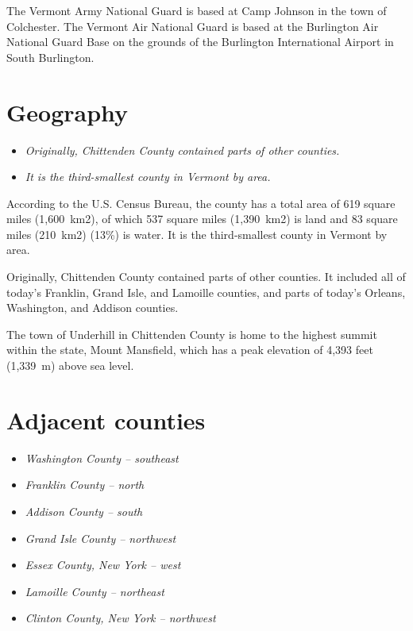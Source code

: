 The Vermont Army National Guard is based at Camp Johnson in the town of
Colchester. The Vermont Air National Guard is based at the Burlington
Air National Guard Base on the grounds of the Burlington International
Airport in South Burlington.

\section{Geography}\label{geography}

\begin{itemize}
\item
  \emph{Originally, Chittenden County contained parts of other
  counties.}
\item
  \emph{It is the third-smallest county in Vermont by area.}
\end{itemize}

According to the U.S. Census Bureau, the county has a total area of 619
square miles (1,600~km2), of which 537 square miles (1,390~km2) is land
and 83 square miles (210~km2) (13\%) is water. It is the third-smallest
county in Vermont by area.

Originally, Chittenden County contained parts of other counties. It
included all of today's Franklin, Grand Isle, and Lamoille counties, and
parts of today's Orleans, Washington, and Addison counties.

The town of Underhill in Chittenden County is home to the highest summit
within the state, Mount Mansfield, which has a peak elevation of 4,393
feet (1,339~m) above sea level.

\section{Adjacent counties}\label{adjacent-counties}

\begin{itemize}
\item
  \emph{Washington County -- southeast}
\item
  \emph{Franklin County -- north}
\item
  \emph{Addison County -- south}
\item
  \emph{Grand Isle County -- northwest}
\item
  \emph{Essex County, New York -- west}
\item
  \emph{Lamoille County -- northeast}
\item
  \emph{Clinton County, New York -- northwest}
\end{itemize}

